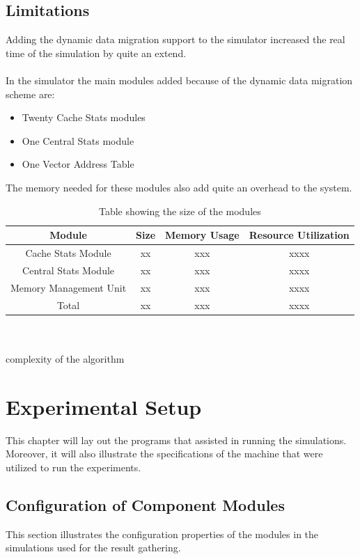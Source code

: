 \documentclass{listhesis}
\begin{document}
\section{Limitations}
Adding the dynamic data migration support to the simulator increased the real time of the simulation by quite an extend. \\
\\
In the simulator the main modules added because of the dynamic data migration scheme are:
\begin{itemize}
  \item Twenty Cache Stats modules
  \item One Central Stats module 
  \item One Vector Address Table
\end{itemize}
The memory needed for these modules also add quite an overhead to the system. 
\begin{table}[h!]
\begin{center}
 \begin{tabular}{||c c c c||} 
 \hline
 Module & Size & Memory Usage   & Resource Utilization \\ [0.5 ex] 
 \hline\hline
 Cache Stats Module & xx & xxx & xxxx \\ 
 \hline
 Central Stats Module & xx & xxx & xxxx \\
 \hline
 Memory Management Unit & xx & xxx & xxxx \\
 \hline\hline
 Total  & xx & xxx & xxxx \\
  \hline
\end{tabular}
 \caption{Table showing the size of the modules}
 \label{table:modules}
\end{center}
\end{table}
\\ 
\\
complexity of the algorithm
\chapter{Experimental Setup}
This chapter will lay out the programs that assisted in running the simulations. Moreover, it will also illustrate the specifications of the machine that were utilized to run the experiments.
\section{Configuration of Component Modules}
This section illustrates the configuration properties of the modules in the simulations used for the result gathering.
\end{document}
